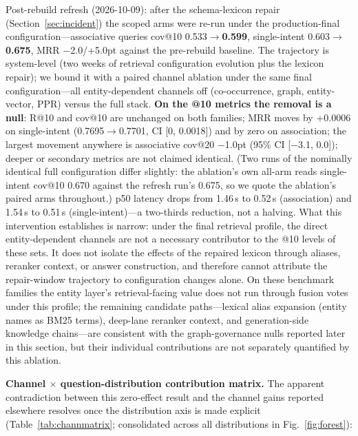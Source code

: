 \documentclass[sigconf,nonacm]{acmart}
\begin{document}
Post-rebuild refresh (2026-10-09): after the schema-lexicon repair
(Section~\ref{sec:incident}) the scoped arms were re-run under the
production-final configuration---associative queries cov@10
0.533$\to$\textbf{0.599}, single-intent 0.603$\to$\textbf{0.675}, MRR
$-$2.0/+5.0pt against the pre-rebuild baseline. The trajectory is
system-level (two weeks of retrieval configuration evolution plus the
lexicon repair); we bound it with a paired channel ablation under the
same final configuration---all entity-dependent channels off
(co-occurrence, graph, entity-vector, PPR) versus the full stack.
\textbf{On the @10 metrics the removal is a null}: R@10 and cov@10 are
unchanged on both families; MRR moves by +0.0006 on single-intent
(0.7695$\to$0.7701, CI [0, 0.0018]) and by zero on association; the
largest movement anywhere is associative cov@20 $-$1.0pt (95\% CI
[$-$3.1, 0.0]); deeper or secondary metrics are not claimed identical.
(Two runs of the nominally identical full configuration differ
slightly: the ablation's own all-arm reads single-intent cov@10 0.670
against the refresh run's 0.675, so we quote the ablation's paired arms
throughout.) p50 latency drops from 1.46\,s to 0.52\,s (association)
and 1.54\,s to 0.51\,s (single-intent)---a two-thirds reduction, not a
halving. What this intervention establishes is narrow: under the final
retrieval profile, the direct entity-dependent channels are not a
necessary contributor to the @10 levels of these sets. It does not
isolate the effects of the repaired lexicon through aliases, reranker
context, or answer construction, and therefore cannot attribute the
repair-window trajectory to configuration changes alone. On these
benchmark families the entity layer's retrieval-facing value does not
run through fusion votes under this profile; the remaining candidate
paths---lexical alias expansion (entity names as BM25 terms), deep-lane
reranker context, and generation-side knowledge chains---are consistent
with the graph-governance nulls reported later in this section, but
their individual contributions are not separately quantified by this
ablation.

\textbf{Channel $\times$ question-distribution contribution matrix.} The
apparent contradiction between this zero-effect result and the channel
gains reported elsewhere resolves once the distribution axis is made
explicit (Table~\ref{tab:channmatrix}; consolidated across all
distributions in Fig.~\ref{fig:forest}):
\end{document}
